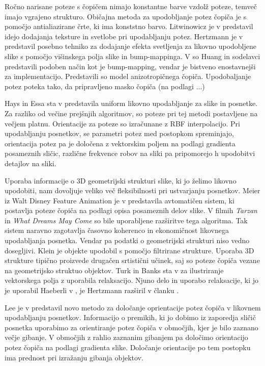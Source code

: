 Ročno narisane poteze s čopičem nimajo konstantne barve vzdolž poteze, temveč imajo vgrajeno strukturo. Običajna metoda za upodobljanje potez čopiča je s pomočjo antialiazirane črte, ki ima konststno barvo. Litwinowicz je v \cite{Litwinowicz:VideoImpressionist} predstavil idejo dodajanja teksture in svetlobe pri upodabljanju potez. Hertzmann je v \cite{Hertzmann:Texture} predstavil posebno tehniko za dodajanje efekta svetljenja za likovno upodobljene slike s pomočjo višinskega polja slike in bump-mappinga. %
V \cite{Huang:Natural} so Huang in sodelavci predstavili podoben način kot je bump-mapping, vendar je bistveno enostavnejši za implementacijo. Predstavili so model anizotropičnega čopiča. Upodobaljanje potez poteka tako, da pripravljeno masko čopiča (na podlagi ...)%

Hays in Essa sta v \cite{Hays:Animation} predstavila uniform %
likovno upodabljanje za slike in posnetke. Za razliko od večine prejšnjih algoritmov, so poteze pri tej metodi postavljene na večjem platnu. Orientacije za poteze so izračunane z RBF interpolacijo. Pri upodabljanju posnetkov, se parametri potez med postopkom spreminjajo, orientacija potez pa je določena z vektorskim poljem na podlagi gradienta posameznih sličic, različne frekvence robov na sliki pa pripomorejo h upodobitvi detajlov na sliki.


Uporaba informacije o 3D geometrijski strukturi slike, ki jo želimo likovno upodobiti, nam dovoljuje veliko več fleksibilnosti pri ustvarjanju posnetkov. Meier iz Walt Disney Feature Animation je %
v \cite{Meier:Animation} predstavila avtomatičen sistem, ki postavlja poteze čopiča na podlagi opisa posameznih delov slike. %
V filmih \textit{Tarzan} \cite{Daniels:Tarzan} in \textit{What Dreams May Come} %
so bile uporabljene razširitve tega algoritma.  Tak sistem naravno zagotavlja časovno koherenco in ekonomičnost likovnega upodabljanja posnetka. Vendar pa podatki o geometrijski strukturi niso vedno dosegljivi. Klein \cite{Klein:Virtual} je objekte upodobil s pomočjo filtrirane strukture. %
Uporaba 3D strukture tipično proizvede drugačen srtistični učinek, saj so poteze čopiča vezane na geometrijsko struktuo objektov. Turk in Banks sta v \cite{Turk:Guided} za ilustriranje vektorskega polja z uporabila relaksacijo. Njuno delo in uporabo relaksacije, ki jo je uporabil Haeberli v \cite{Haeberli:PaintNumbers}, je Hertzmann razširil v članku \cite{Hertzmann:Relaxation}.

Lee je v \cite{Lee:Motion} predstavil novo metodo za določanje oprientacije potez čopiča v likovnem upodabljanju posnetkov. Informacijo o premikih, ki jo dobimo iz zaporedja sličič posnetka uporabimo za orientiranje potez čopiča v območjih, kjer je bilo zaznano večje gibanje. %
V območjih z rahlio zaznanim gibanjem pa določimo orientacijo potez čopiča na podlagi gradienta slike. %
Določanje orientacije po tem postopku ima prednost pri izražanju gibanja objektov. 